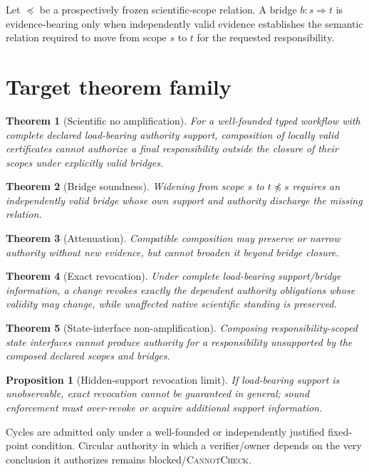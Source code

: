 \documentclass[11pt]{article}
\newtheorem{theorem}{Theorem}
\newtheorem{proposition}{Proposition}
\begin{document}
Let $\preceq$ be a prospectively frozen scientific-scope relation. A bridge $b:s\Rightarrow t$ is evidence-bearing only when independently valid evidence establishes the semantic relation required to move from scope $s$ to $t$ for the requested responsibility.

\section{Target theorem family}
\begin{theorem}[Scientific no amplification]
For a well-founded typed workflow with complete declared load-bearing authority support, composition of locally valid certificates cannot authorize a final responsibility outside the closure of their scopes under explicitly valid bridges.
\end{theorem}

\begin{theorem}[Bridge soundness]
Widening from scope $s$ to $t\not\preceq s$ requires an independently valid bridge whose own support and authority discharge the missing relation.
\end{theorem}

\begin{theorem}[Attenuation]
Compatible composition may preserve or narrow authority without new evidence, but cannot broaden it beyond bridge closure.
\end{theorem}

\begin{theorem}[Exact revocation]
Under complete load-bearing support/bridge information, a change revokes exactly the dependent authority obligations whose validity may change, while unaffected native scientific standing is preserved.
\end{theorem}

\begin{theorem}[State-interface non-amplification]
Composing responsibility-scoped state interfaces cannot produce authority for a responsibility unsupported by the composed declared scopes and bridges.
\end{theorem}

\begin{proposition}[Hidden-support revocation limit]
If load-bearing support is unobservable, exact revocation cannot be guaranteed in general; sound enforcement must over-revoke or acquire additional support information.
\end{proposition}

Cycles are admitted only under a well-founded or independently justified fixed-point condition. Circular authority in which a verifier/owner depends on the very conclusion it authorizes remains blocked/\textsc{CannotCheck}.
\end{document}
